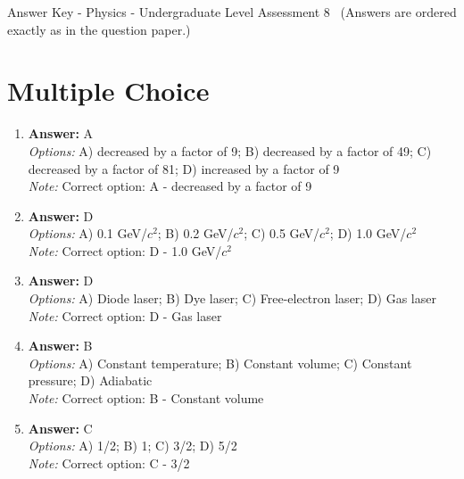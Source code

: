 \documentclass[12pt]{article}
\begin{document}
\begin{center}
Answer Key - Physics - Undergraduate Level Assessment 8 \
\small (Answers are ordered exactly as in the question paper.)
\end{center}

\section*{Multiple Choice}
\begin{enumerate}[label=\arabic*.]
\item \textbf{Answer:} A
\\ \textit{Options:} A) decreased by a factor of 9; B) decreased by a factor of 49; C) decreased by a factor of 81; D) increased by a factor of 9
\\ \textit{Note:} Correct option: A - decreased by a factor of 9
\item \textbf{Answer:} D
\\ \textit{Options:} A) 0.1 GeV/$c^2$; B) 0.2 GeV/$c^2$; C) 0.5 GeV/$c^2$; D) 1.0 GeV/$c^2$
\\ \textit{Note:} Correct option: D - 1.0 GeV/$c^2$
\item \textbf{Answer:} D
\\ \textit{Options:} A) Diode laser; B) Dye laser; C) Free-electron laser; D) Gas laser
\\ \textit{Note:} Correct option: D - Gas laser
\item \textbf{Answer:} B
\\ \textit{Options:} A) Constant temperature; B) Constant volume; C) Constant pressure; D) Adiabatic
\\ \textit{Note:} Correct option: B - Constant volume
\item \textbf{Answer:} C
\\ \textit{Options:} A) 1/2; B) 1; C) 3/2; D) 5/2
\\ \textit{Note:} Correct option: C - 3/2
\end{enumerate}
\end{document}
